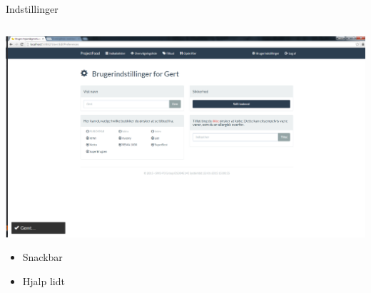 \begin{frame}{Indstillinger}

	
	\begin{minipage}[0.3\textheight]{\textwidth}
	\begin{columns}[T]
	\begin{column}{1\textwidth}
	\vspace{-15 pt}
	 \includegraphics[width=1\textwidth,height=1\textheight,keepaspectratio, trim={1cm 0 0 16mm}, clip]{images/Screenshots/Settings.png}
	
	\begin{itemize}
		\item Snackbar
		\item Hjalp lidt
	\end{itemize}
	\end{column}

	\end{columns}

  \end{minipage}
	
\end{frame}
